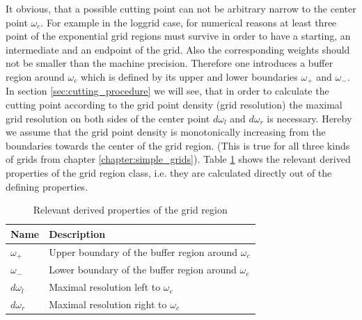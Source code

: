 It obvious, that a possible cutting point can not be arbitrary narrow to the center point $\omega_c$. For example in the loggrid case, for numerical reasons at least three point of the exponential grid regions must survive in order to have a starting, an intermediate and an endpoint of the grid. Also the corresponding weights should not be smaller than the machine precision. Therefore one introduces a buffer region around $\omega_c$ which is defined by its upper and lower boundaries $\omega_+$ and $\omega_-$. In section \ref{sec:cutting_procedure} we will see, that in order to calculate the cutting point according to the grid point density (grid resolution) the maximal grid resolution on both sides of the center point $d\omega_l$ and $d\omega_r$ is necessary. Hereby we assume that the grid point density is monotonically increasing from the boundaries towards the center of the grid region. (This is true for all three kinds of grids from chapter \ref{chapter:simple_grids}). Table \ref{tab:grid_region_derived_members} shows the relevant derived properties of the grid region class, i.e. they are calculated directly out of the defining properties.
\begin{table}[h]
	\begin{center}
		\begin{tabular}{ll}
		Name & Description \\ 
		\hline
		$\omega_+$  & Upper boundary of the buffer region around $\omega_c$ \\
		$\omega_-$  & Lower boundary of the buffer region around $\omega_c$ \\
		$d\omega_l$  & Maximal resolution left to $\omega_c$ \\
		$d\omega_r$  & Maximal resolution right to $\omega_c$ \\
		\end{tabular}
	\end{center}
	\caption{Relevant derived properties of the grid region}
	\label{tab:grid_region_derived_members}
\end{table}

